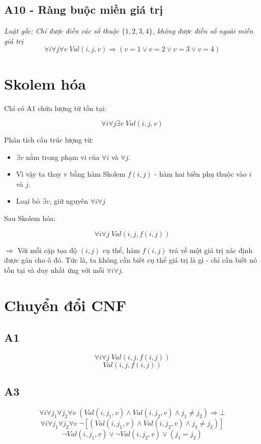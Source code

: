 \subsection*{A10 - Ràng buộc miền giá trị}
\textit{Luật  gốc: Chỉ được điền các số thuộc $\{1, 2, 3, 4\}$, không được điền số ngoài miền giá trị}
\[
\forall i \forall j \forall v \;
Val(i,j,v) \Rightarrow (v=1 \lor v=2 \lor v=3 \lor v=4)
\]

\section{Skolem hóa}

Chỉ có A1 chứa lượng từ tồn tại:

\[
\forall i \forall j \exists v \; Val(i,j,v)
\]

Phân tích cấu trúc lượng từ:
\begin{itemize}
    \item $\exists v$ nằm trong phạm vi của $\forall i$ và $\forall j$.
    \item Vì vậy ta thay v bằng hàm Skolem $f(i, j)$ - hàm hai biến phụ thuộc vào $i$ và $j$.
    \item Loại bỏ $\exists v$, giữ nguyên $\forall i \forall j$
\end{itemize}

Sau Skolem hóa:

\[
\forall i \forall j \; Val(i,j,f(i,j))
\]

$\Rightarrow$ Với mỗi cặp tọa độ $(i, j)$ cụ thể, hàm $f(i, j)$ trả về một giá trị xác định được gán cho ô đó. Tức là, ta không cần biết cụ thể giá trị là gì - chỉ cần biết nó tồn tại và duy nhất ứng với mỗi $\forall i \forall j$.

\section{Chuyển đổi CNF}

\subsection{A1}
\[
\forall i \forall j \; Val(i,j,f(i,j))
\]
\[
Val(i,j,f(i,j))
\]

\subsection{A3}
\[
\forall i \forall j_1 \forall j_2 \forall v \;
(Val(i,j_1,v) \land Val(i,j_2,v) \land j_1 \neq j_2) \Rightarrow \bot
\]
\[
\forall i \forall j_1 \forall j_2 \forall v \;
\neg [(Val(i,j_1,v) \land Val(i,j_2,v) \land j_1 \neq j_2)]
\]
\[
\neg Val(i,j_1,v) \lor \neg Val(i,j_2,v) \lor (j_1 = j_2)
\]

